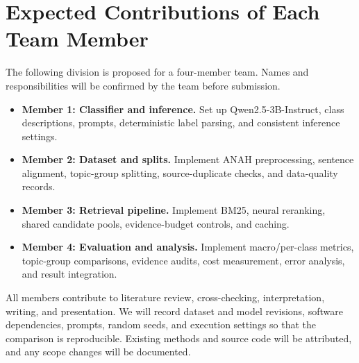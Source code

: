 \section{Expected Contributions of Each Team Member}
\label{section:contribution}
The following division is proposed for a four-member team. Names and responsibilities will be confirmed by the team before submission.
\begin{itemize}
\item \textbf{Member 1: Classifier and inference.} Set up Qwen2.5-3B-Instruct, class descriptions, prompts, deterministic label parsing, and consistent inference settings.
\item \textbf{Member 2: Dataset and splits.} Implement ANAH preprocessing, sentence alignment, topic-group splitting, source-duplicate checks, and data-quality records.
\item \textbf{Member 3: Retrieval pipeline.} Implement BM25, neural reranking, shared candidate pools, evidence-budget controls, and caching.
\item \textbf{Member 4: Evaluation and analysis.} Implement macro/per-class metrics, topic-group comparisons, evidence audits, cost measurement, error analysis, and result integration.
\end{itemize}
All members contribute to literature review, cross-checking, interpretation, writing, and presentation. We will record dataset and model revisions, software dependencies, prompts, random seeds, and execution settings so that the comparison is reproducible. Existing methods and source code will be attributed, and any scope changes will be documented.
